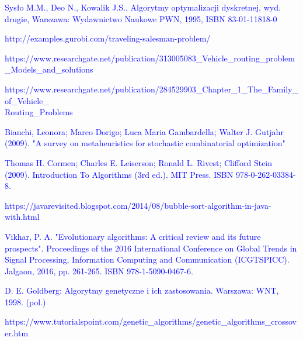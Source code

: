\documentclass[a4paper, twoside, 12pt, justified]{article}
\begin{document}
	
	\newpage
	\renewcommand\refname{Źródła}
	\begin{thebibliography}{}

		{\hypertarget{komiwojazer}{\textcolor{blue}{
		Sysło M.M., Deo N., Kowalik J.S., Algorytmy optymalizacji dyskretnej, wyd. drugie, Warszawa: Wydawnictwo Naukowe PWN, 1995, ISBN 83-01-11818-0}}}
	
		{\hypertarget{tsp_math_model}{\textcolor{blue}{
		http://examples.gurobi.com/traveling-salesman-problem/}}}
	
	 
	 	{\hypertarget{vrp_all}{\textcolor{blue}{
		https://www.researchgate.net/publication/313005083\_Vehicle\_routing\_problem\_Models\_and\_solutions}}}
		
		{\hypertarget{cvrp-irnich}{\textcolor{blue}{https://www.researchgate.net/publication/284529903\_Chapter\_1\_The\_Family\_of\_Vehicle\_\\Routing\_Problems}}}
		
		{\hypertarget{metaheurystyka}{\textcolor{blue}{Bianchi, Leonora; Marco Dorigo; Luca Maria Gambardella; Walter J. Gutjahr (2009). "A survey on metaheuristics for stochastic combinatorial optimization"}}}
		
		{\hypertarget{algorithm}{\textcolor{blue}{
		Thomas H. Cormen; Charles E. Leiserson; Ronald L. Rivest; Clifford Stein (2009). Introduction To Algorithms (3rd ed.). MIT Press. ISBN 978-0-262-03384-8.}}}
	
		{\hypertarget{bubble}{\textcolor{blue}{
		https://javarevisited.blogspot.com/2014/08/bubble-sort-algorithm-in-java-with.html}}}
	
		{\hypertarget{evolutionaryalgorithm}{\textcolor{blue}{
		 Vikhar, P. A. "Evolutionary algorithms: A critical review and its future prospects". Proceedings of the 2016 International Conference on Global Trends in Signal Processing, Information Computing and Communication (ICGTSPICC). Jalgaon, 2016, pp. 261-265. ISBN 978-1-5090-0467-6.}}}
	

		
		{\hypertarget{ag}{\textcolor{blue}{
		D. E. Goldberg: Algorytmy genetyczne i ich zastosowania. Warszawa: WNT, 1998. (pol.)}}}
	
		{\hypertarget{cross}{\textcolor{blue}{
		https://www.tutorialspoint.com/genetic\_algorithms/genetic\_algorithms\_crossover.htm}}}
	

\end{thebibliography}
\end{document}
